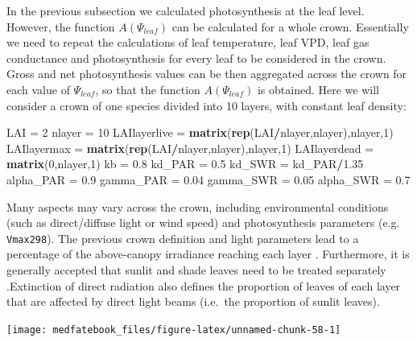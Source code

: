 \documentclass[]{book}
\newenvironment{Shaded}{\begin{snugshade}}{\end{snugshade}}
\newcommand{\KeywordTok}[1]{\textcolor[rgb]{0.13,0.29,0.53}{\textbf{#1}}}
\newcommand{\DecValTok}[1]{\textcolor[rgb]{0.00,0.00,0.81}{#1}}
\newcommand{\FloatTok}[1]{\textcolor[rgb]{0.00,0.00,0.81}{#1}}
\newcommand{\StringTok}[1]{\textcolor[rgb]{0.31,0.60,0.02}{#1}}
\newcommand{\OperatorTok}[1]{\textcolor[rgb]{0.81,0.36,0.00}{\textbf{#1}}}
\newcommand{\NormalTok}[1]{#1}
\begin{document}
In the previous subsection we calculated photosynthesis at the leaf level. However, the function \(A(\Psi_{leaf})\) can be calculated for a whole crown. Essentially we need to repeat the calculations of leaf temperature, leaf VPD, leaf gas conductance and photosynthesis for every leaf to be considered in the crown. Gross and net photosynthesis values can be then aggregated across the crown for each value of \(\Psi_{leaf}\), so that the function \(A(\Psi_{leaf})\) is obtained. Here we will consider a crown of one species divided into 10 layers, with constant leaf density:

\begin{Shaded}
\begin{Highlighting}[]
\NormalTok{LAI =}\StringTok{ }\DecValTok{2}
\NormalTok{nlayer =}\StringTok{ }\DecValTok{10}
\NormalTok{LAIlayerlive =}\StringTok{ }\KeywordTok{matrix}\NormalTok{(}\KeywordTok{rep}\NormalTok{(LAI}\OperatorTok{/}\NormalTok{nlayer,nlayer),nlayer,}\DecValTok{1}\NormalTok{)}
\NormalTok{LAIlayermax =}\StringTok{ }\KeywordTok{matrix}\NormalTok{(}\KeywordTok{rep}\NormalTok{(LAI}\OperatorTok{/}\NormalTok{nlayer,nlayer),nlayer,}\DecValTok{1}\NormalTok{)}
\NormalTok{LAIlayerdead =}\StringTok{ }\KeywordTok{matrix}\NormalTok{(}\DecValTok{0}\NormalTok{,nlayer,}\DecValTok{1}\NormalTok{)}
\NormalTok{kb =}\StringTok{ }\FloatTok{0.8}
\NormalTok{kd_PAR =}\StringTok{ }\FloatTok{0.5}
\NormalTok{kd_SWR =}\StringTok{ }\NormalTok{kd_PAR}\OperatorTok{/}\FloatTok{1.35}
\NormalTok{alpha_PAR =}\StringTok{ }\FloatTok{0.9}
\NormalTok{gamma_PAR =}\StringTok{ }\FloatTok{0.04}
\NormalTok{gamma_SWR =}\StringTok{ }\FloatTok{0.05}
\NormalTok{alpha_SWR =}\StringTok{ }\FloatTok{0.7}
\end{Highlighting}
\end{Shaded}

Many aspects may vary across the crown, including environmental conditions (such as direct/diffuse light or wind speed) and photosynthesis parameters (e.g. \texttt{Vmax298}). The previous crown definition and light parameters lead to a percentage of the above-canopy irradiance reaching each layer \citep{Anten2016}. Furthermore, it is generally accepted that sunlit and shade leaves need to be treated separately \citep{DePury1997}.Extinction of direct radiation also defines the proportion of leaves of each layer that are affected by direct light beams (i.e.~the proportion of sunlit leaves).

\begin{center}\texttt{[image: medfatebook\_files/figure-latex/unnamed-chunk-58-1]} \end{center}
\end{document}
